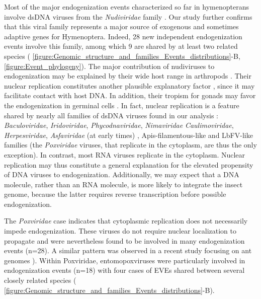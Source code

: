 Most of the major endogenization events characterized so far in hymenopterans involve dsDNA viruses from the \textit{Nudiviridae} family \citep{cheng_nudivirus_2020, burke_common_2019,pichon_recurrent_2015,bezier_polydnaviruses_2009-1, cheng_brown_2014, zhang_chalcid_2020, gilbert_diversity_2022}. Our study further confirms that this viral family represents a major source of exogenous and sometimes adaptive genes for Hymenoptera. Indeed, 28 new independent endogenization events involve this family, among which 9 are shared by at least two related species (\figurename{ \ref{figure:Genomic_structure_and_families_Events_distributions}-B}, \figurename{\ref{figure:Event_phylogeny}}). 
The major contribution of nudiviruses to endogenization may be explained by their wide host range in arthropods \citep{wang_nudivirus_2007}.  Their nuclear replication constitutes another plausible explanatory factor \citep{velamoor_visualizing_2020}, since it may facilitate contact with host DNA. In addition, their tropism for gonads may favor the endogenization in germinal cells \citep{burand_sexually_2009}. In fact, nuclear replication is a feature shared by nearly all families of dsDNA viruses found in our analysis : \textit{Baculoviridae}, \textit{Iridoviridae}, \textit{Phycodnaviridae}, \textit{Nimaviridae} \textit{Caulimoviridae}, \textit{Herpesviridae}, \textit{Asfaviridae} (at early times) \citep{schmid_dna_2014, harrison_ictv_2020, international_committee_on_taxonomy_of_viruses_virus_2012, teycheney_ictv_2020,verbruggen_molecular_2016}, Apis-filamentous-like \citep{clark_filamentous_1978} and LbFV-like families \citep{varaldi_artifical_2006} (the \textit{Poxviridae} viruses, that replicate in the cytoplasm, are thus the only exception). In contrast, most RNA viruses replicate in the cytoplasm. Nuclear replication may thus constitute a general explanation for the elevated propensity of DNA viruses to endogenization. Additionally, we may expect that a DNA molecule, rather than an RNA molecule, is more likely to integrate the insect genome, because the latter requires reverse transcription before possible endogenization.

The \textit{Poxviridae} case indicates that cytoplasmic replication does not necessarily impede endogenization. These viruses do not require nuclear localization to propagate \citep{moss_poxvirus_2013,schmid_dna_2014} and were nevertheless found to be involved in many endogenization events (n=28). A similar pattern was observed in a recent study focusing on ant genomes \citep{flynn_assessing_2019}). Within Poxviridae, entomopoxviruses were particularly involved in endogenization events (n=18) with four cases of EVEs shared between several closely related species (\figurename{ \ref{figure:Genomic_structure_and_families_Events_distributions}-B}).\\

